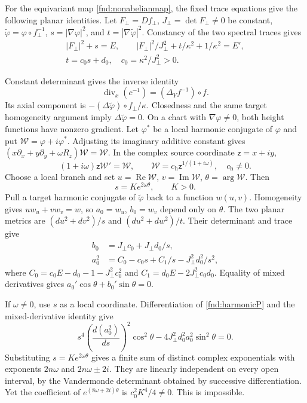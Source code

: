 \documentclass[11pt,a4paper]{article}
\numberwithin{equation}{section}
\theoremstyle{plain}
\theoremstyle{definition}
\theoremstyle{remark}
\begin{document}
For the equivariant map \eqref{fnd:nonabelianmap}, the fixed trace equations give the following planar identities.
Let $F_\perp=Df_\perp$, $J_\perp=\det F_\perp\ne0$ be constant, $\widetilde\varphi=\varphi\circ f_\perp^{-1}$, $s=|\nabla\varphi|^2$, and $t=|\nabla\widetilde\varphi|^2$. Constancy of the two spectral traces gives
\begin{equation}\label{fnd:nonabelianenergy}
\begin{gathered}
|F_\perp|^2+s=E,\qquad |F_\perp|^2/J_\perp^2+t/\kappa^2+1/\kappa^2=E',\\
t=c_0s+d_0,\quad c_0=\kappa^2/J_\perp^2>0.
\end{gathered}
\end{equation}

Constant determinant gives the inverse identity
\begin{equation}\label{fnd:inverseidentity}
\operatorname{div}_x(c^{-1})=(\Delta_Y f^{-1})\circ f.
\end{equation}
Its axial component is $-(\Delta\widetilde\varphi)\circ f_\perp/\kappa$. Closedness and the same target homogeneity argument imply $\Delta\widetilde\varphi=0$. 
On a chart with $\nabla\varphi\ne0$, both height functions have nonzero gradient. Let $\varphi^{\ast}$ be a local harmonic conjugate of $\varphi$ and put $\mathcal W=\varphi+i\varphi^{\ast}$. Adjusting its imaginary additive constant gives $(x\partial_x+y\partial_y+\omega R_z)\mathcal W=\mathcal W$. In the complex source coordinate $\mathsf z=x+iy$,
\[
(1+i\omega)\mathsf z\mathcal W'=\mathcal W,\qquad \mathcal W=c_{\mathrm h}\mathsf z^{1/(1+i\omega)},\quad c_{\mathrm h}\ne0.
\]
Choose a local branch and set $u=\operatorname{Re}\mathcal W$, $v=\operatorname{Im}\mathcal W$, $\theta=\arg\mathcal W$. Then
\[
s=K e^{2\omega\theta},\qquad K>0.
\]
Pull a target harmonic conjugate of $\widetilde\varphi$ back to a function $w(u,v)$. Homogeneity gives $uw_u+vw_v=w$, so $a_0=w_u$, $b_0=w_v$ depend only on $\theta$. The two planar metrics are $(du^2+dv^2)/s$ and $(du^2+dw^2)/t$. Their determinant and trace give
\begin{align}
b_0&=J_\perp c_0+J_\perp d_0/s,\label{fnd:harmonicb}\\
a_0^2&=C_0-c_0s+C_1/s-J_\perp^2d_0^2/s^2,\label{fnd:harmonicP}
\end{align}
where $C_0=c_0E-d_0-1-J_\perp^2c_0^2$ and $C_1=d_0E-2J_\perp^2c_0d_0$. Equality of mixed derivatives gives $a_0'\cos\theta+b_0'\sin\theta=0$.

If $\omega\ne0$, use $s$ as a local coordinate. Differentiation of \eqref{fnd:harmonicP} and the mixed-derivative identity give
\[
s^4\left(\frac{d(a_0^2)}{ds}\right)^2\cos^2\theta
-4J_\perp^2d_0^2a_0^2\sin^2\theta=0.
\]
Substituting $s=Ke^{2\omega\theta}$ gives a finite sum of distinct complex exponentials with exponents $2n\omega$ and $2n\omega\pm2i$. They are linearly independent on every open interval, by the Vandermonde determinant obtained by successive differentiation. Yet the coefficient of $e^{(8\omega+2i)\theta}$ is $c_0^2K^4/4\ne0$. This is impossible.
\end{document}
